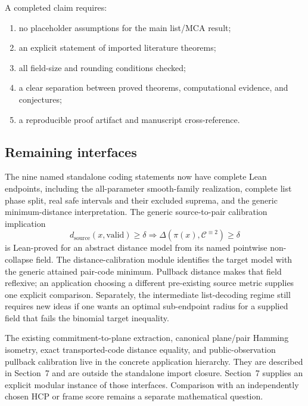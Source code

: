 A completed claim requires:
\begin{enumerate}[label=(\roman*)]
  \item no placeholder assumptions for the main list/MCA result;
  \item an explicit statement of imported literature theorems;
  \item all field-size and rounding conditions checked;
  \item a clear separation between proved theorems, computational evidence, and
    conjectures;
  \item a reproducible proof artifact and manuscript cross-reference.
\end{enumerate}

\subsection{Remaining interfaces}

The nine named standalone coding statements now have complete Lean
endpoints, including the all-parameter smooth-family realization, complete
list phase split, real safe intervals and their excluded suprema, and the
generic minimum-distance interpretation. The generic source-to-pair calibration implication
\[
  d_{\mathrm{source}}(x,\mathrm{valid})\ge\delta
  \Longrightarrow
  \Delta(\pi(x),\mathcal C^{\equiv2})\ge\delta
\]
is Lean-proved for an abstract distance model from its named pointwise
non-collapse field. The distance-calibration module identifies the target
model with the generic attained pair-code minimum. Pullback distance
makes that field reflexive; an application choosing a different pre-existing
source metric supplies one explicit comparison.
Separately, the intermediate list-decoding regime still requires new ideas if
one wants an optimal sub-endpoint radius for a supplied field that fails the
binomial target inequality.

The existing commitment-to-plane extraction, canonical plane/pair Hamming
isometry, exact transported-code distance equality, and public-observation
pullback calibration live in the concrete application hierarchy. They are
described in Section~7 and are outside the standalone
 import closure. Section~7 supplies an explicit modular
instance of those interfaces. Comparison with an independently chosen HCP or
frame score remains a separate mathematical question.

